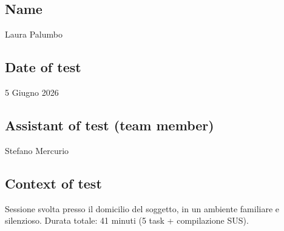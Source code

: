 \documentclass[11pt,a4paper]{article}
\begin{document}
\vspace{0.5cm}

\subsection*{Name \normalfont\small\itshape}
\begin{tcolorbox}[colback=backgroundColor,colframe=borderColor,arc=2mm]
Laura Palumbo
\end{tcolorbox}

\subsection*{Date of test}
\begin{tcolorbox}[colback=backgroundColor,colframe=borderColor,arc=2mm]
    5 Giugno 2026
\end{tcolorbox}

\subsection*{Assistant of test (team member)}
\begin{tcolorbox}[colback=backgroundColor,colframe=borderColor,arc=2mm]
Stefano Mercurio
\end{tcolorbox}

\subsection*{Context of test}
\begin{tcolorbox}[colback=backgroundColor,colframe=borderColor,arc=2mm]
Sessione svolta presso il domicilio del soggetto, in un
ambiente familiare e silenzioso. Durata totale: 41 minuti
(5 task + compilazione SUS).
\end{tcolorbox}
\end{document}
